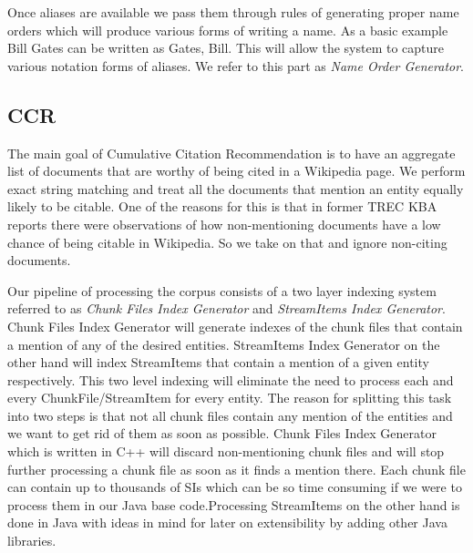 Once aliases are available we pass them through rules of generating proper name orders which will produce various forms of writing a name. As a basic example Bill Gates can be written as Gates, Bill. This will allow the system to capture various notation forms of aliases. We refer to this part as \textit{Name Order Generator}.

\subsection{CCR}

The main goal of Cumulative Citation Recommendation is to have an aggregate list of documents that are worthy of being cited in a Wikipedia page. We perform exact string matching 
and treat all the documents that mention an entity equally likely to be citable. One of the reasons for this is 
that in former TREC KBA reports \cite{JFrank12} there were observations of how 
non-mentioning documents have a low chance of being citable in Wikipedia.
So we take on that and ignore non-citing documents. 

Our pipeline of processing the corpus consists of a two layer indexing system referred to as \textit{Chunk Files Index Generator} and \textit{StreamItems Index Generator}.  Chunk Files Index Generator will generate indexes of the chunk files that contain a mention of any of the desired entities. StreamItems Index Generator on the other hand will index StreamItems that contain a mention of a given entity respectively. This two level indexing will eliminate the need to process each and every ChunkFile/StreamItem for every entity. The reason for splitting this task into two steps is that not all chunk files contain any mention of the entities and we want to get rid of them as soon as possible. Chunk Files Index Generator which is written in C++ will discard non-mentioning chunk files and will stop further processing a chunk file as soon as it finds a mention there. Each chunk file can contain up to thousands of SIs which can be so time consuming if we were to process them in our Java base code.Processing StreamItems on the other hand is done in Java with ideas in mind for later on extensibility by adding other Java libraries.







